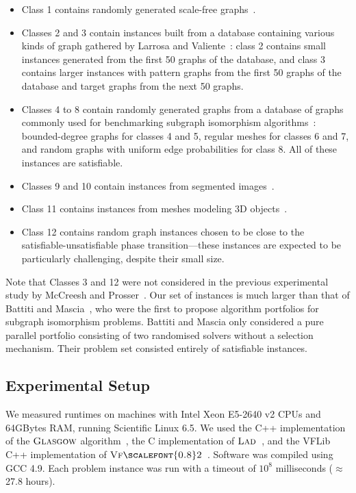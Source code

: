 \documentclass{llncs}
\newcommand{\VFtwo}{$\textsc{Vf{\scalefont{0.8}2}}$\xspace}
\newcommand{\Glasgow}{$\textsc{Glasgow}$\xspace}
\newcommand{\LAD}{$\textsc{Lad}$\xspace}
\begin{document}
\begin{itemize}
\item Class 1 contains randomly generated scale-free graphs~\cite{constraints10}.
\item Classes 2 and 3 contain instances built from a database containing
    various kinds of graph gathered by Larrosa and Valiente~\cite{LV02}: class
    2 contains small instances generated from the first 50 graphs of the
    database, and class 3 contains larger instances with pattern graphs from
    the first 50 graphs of the database and target graphs from the next 50
    graphs.
\item Classes 4 to 8 contain randomly generated graphs from a database of
    graphs commonly used for benchmarking subgraph isomorphism
    algorithms~\cite{GraphDatabase1}: bounded-degree graphs for
    classes 4 and 5, regular meshes for classes 6 and 7, and random graphs with
    uniform edge probabilities for class 8. All of these instances are
    satisfiable.
\item Classes 9 and 10 contain instances from segmented images~\cite{pr15,cviu11}.
\item Class 11 contains instances from meshes modeling 3D objects~\cite{cviu11}.
\item Class 12 contains random graph instances chosen to be close to the satisfiable-unsatisfiable
    phase transition---these instances are expected to be particularly challenging, despite their
    small size.
\end{itemize}

\noindent Note that Classes 3 and 12 were not considered in the previous
experimental study by McCreesh and Prosser~\cite{McCreesh:2015}.  Our set of
instances is much larger than that of Battiti and
Mascia~\cite{battiti-mascia07}, who were the first to propose algorithm
portfolios for subgraph isomorphism problems.  Battiti and Mascia only
considered a pure parallel portfolio consisting of two randomised solvers
without a selection mechanism. Their problem set consisted entirely of
satisfiable instances.

\subsection{Experimental Setup}

We measured runtimes on machines with Intel Xeon E5-2640 v2 CPUs and 64GBytes RAM, running
Scientific Linux 6.5. We used the C++ implementation of the \Glasgow algorithm~\cite{McCreesh:2015},
the C implementation of \LAD{}~\cite{Solnon:2010}, and the VFLib C++
implementation of \VFtwo{}~\cite{Cordella:2004}. Software was compiled using GCC 4.9. Each problem instance was run with a
timeout of $10^8$ milliseconds ($\approx$ 27.8 hours).
\end{document}
